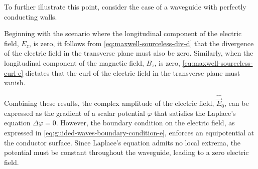 \documentclass[11pt,a4paper,twoside,openany]{report}
\begin{document}
\begin{remark}
    \label{remark:nonexistence-of-tem-waves-in-hollow-waveguides}
    To further illustrate this point, consider the case of a waveguide with perfectly conducting walls.
    
    Beginning with the scenario where the longitudinal component of the electric field, $E_z$, is zero, it follows from \cref{eq:maxwell-sourceless-div-d} that the divergence of the electric field in the transverse plane must also be zero. Similarly, when the longitudinal component of the magnetic field, $B_z$, is zero, \cref{eq:maxwell-sourceless-curl-e} dictates that the curl of the electric field in the transverse plane must vanish.
    
    Combining these results, the complex amplitude of the electric field, $\hat{\vec E}_0$, can be expressed as the gradient of a scalar potential $\varphi$ that satisfies the Laplace's equation $\Delta\varphi = 0$. However, the boundary condition on the electric field, as expressed in \cref{eq:guided-waves-boundary-condition-e}, enforces an equipotential at the conductor surface. Since Laplace's equation admits no local extrema, the potential must be constant throughout the waveguide, leading to a zero electric field.
\end{remark}
\end{document}
